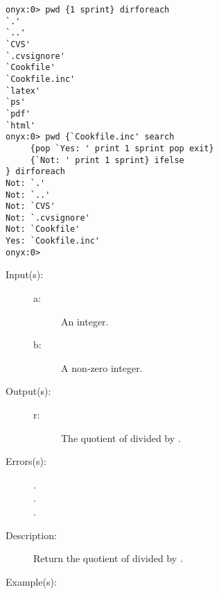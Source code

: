 \begin{description}
\begin{description}
\begin{verbatim}
onyx:0> pwd {1 sprint} dirforeach
`.'
`..'
`CVS'
`.cvsignore'
`Cookfile'
`Cookfile.inc'
`latex'
`ps'
`pdf'
`html'
onyx:0> pwd {`Cookfile.inc' search
     {pop `Yes: ' print 1 sprint pop exit}
     {`Not: ' print 1 sprint} ifelse
} dirforeach
Not: `.'
Not: `..'
Not: `CVS'
Not: `.cvsignore'
Not: `Cookfile'
Yes: `Cookfile.inc'
onyx:0>
		\end{verbatim}
	\end{description}
\label{systemdict:div}
\item[{\onyxop{a b}{div}{r}}: ]
	\begin{description}\item[]
	\item[Input(s): ]
		\begin{description}\item[]
		\item[a: ]
			An integer.
		\item[b: ]
			A non-zero integer.
		\end{description}
	\item[Output(s): ]
		\begin{description}\item[]
		\item[r: ]
			The quotient of  divided by .
		\end{description}
	\item[Errors(s): ]
		\begin{description}\item[]
		\item[.]
		\item[.]
		\item[.]
		\end{description}
	\item[Description: ]
		Return the quotient of  divided by .
	\item[Example(s): ]\begin{verbatim}


\end{verbatim}
\end{description}
\end{description}
